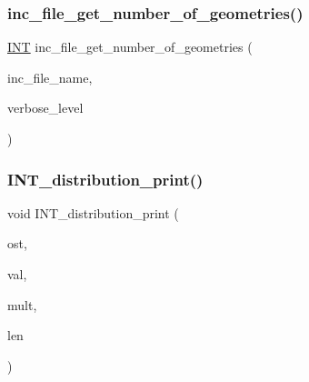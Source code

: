 \mbox{\label{util_8_c_a365e5dc13a95b627c296e1715f4517d3}} 
\subsubsection{\texorpdfstring{inc\+\_\+file\+\_\+get\+\_\+number\+\_\+of\+\_\+geometries()}{inc\_file\_get\_number\_of\_geometries()}}
{\footnotesize\ttfamily \mbox{\hyperlink{galois_8h_a09fddde158a3a20bd2dcadb609de11dc}{I\+NT}} inc\+\_\+file\+\_\+get\+\_\+number\+\_\+of\+\_\+geometries (\begin{DoxyParamCaption}\item[{\mbox{\hyperlink{galois_8h_ab6cc7b4aeb6ea31aba2b3fbfc83ff5e6}{B\+Y\+TE}} $\ast$}]{inc\+\_\+file\+\_\+name,  }\item[{\mbox{\hyperlink{galois_8h_a09fddde158a3a20bd2dcadb609de11dc}{I\+NT}}}]{verbose\+\_\+level }\end{DoxyParamCaption})}

\mbox{\label{util_8_c_a7f3a8c4610142655e2db7ec78534e14f}} 
\subsubsection{\texorpdfstring{I\+N\+T\+\_\+distribution\+\_\+print()}{INT\_distribution\_print()}}
{\footnotesize\ttfamily void I\+N\+T\+\_\+distribution\+\_\+print (\begin{DoxyParamCaption}\item[{ostream \&}]{ost,  }\item[{\mbox{\hyperlink{galois_8h_a09fddde158a3a20bd2dcadb609de11dc}{I\+NT}} $\ast$}]{val,  }\item[{\mbox{\hyperlink{galois_8h_a09fddde158a3a20bd2dcadb609de11dc}{I\+NT}} $\ast$}]{mult,  }\item[{\mbox{\hyperlink{galois_8h_a09fddde158a3a20bd2dcadb609de11dc}{I\+NT}}}]{len }\end{DoxyParamCaption})}

